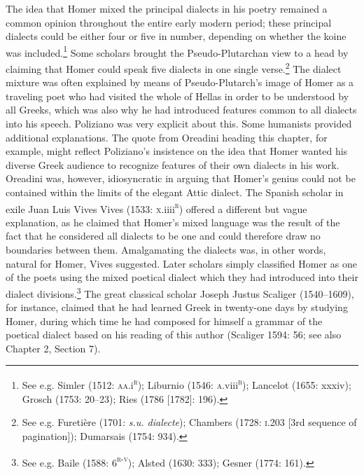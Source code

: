 \begin{styleStandard}
The idea that Homer mixed the principal dialects in his poetry remained a common opinion throughout the entire early modern period; these principal dialects could be either four or five in number, depending on whether the koine was included.\footnote{ See e.g. Simler (1512: \textsc{aa.}i\textsc{\textsuperscript{r}}); Liburnio (1546: \textsc{a}.viii\textsc{\textsuperscript{r}}); Lancelot (1655: xxxiv); Grosch (1753: 20–23); Ries (1786 [1782]: 196).} Some scholars brought the Pseudo-Plutarchan view to a head by claiming that Homer could speak five dialects in one single verse.\footnote{ See e.g. Furetière (1701: \textit{s.u. dialecte}); Chambers (1728: \textsc{i.}203 [3rd sequence of pagination]); Dumarsais (1754: 934).} The dialect mixture was often explained by means of Pseudo-Plutarch’s image of Homer as a traveling poet who had visited the whole of Hellas in order to be understood by all Greeks, which was also why he had introduced features common to all dialects into his speech. Poliziano was very explicit about this. Some humanists provided additional explanations. The quote from Oreadini heading this chapter, for example, might reflect Poliziano’s insistence on the idea that Homer wanted his diverse Greek audience to recognize features of their own dialects in his work. Oreadini was, however, idiosyncratic in arguing that Homer’s genius could not be contained within the limits of the elegant Attic dialect. The Spanish scholar in exile Juan Luis Vives Vives (1533: \textsc{x}.iiii\textsc{\textsuperscript{r}}) offered a different but vague explanation, as he claimed that Homer’s mixed language was the result of the fact that he considered all dialects to be one and could therefore draw no boundaries between them. Amalgamating the dialects was, in other words, natural for Homer, Vives suggested. Later scholars simply classified Homer as one of the poets using the mixed poetical dialect which they had introduced into their dialect divisions.\footnote{ See e.g. Baile (1588: 6\textsc{\textsuperscript{r-v}}); Alsted (1630: 333); Gesner (1774: 161).} The great classical scholar Joseph Justus Scaliger (1540–1609), for instance, claimed that he had learned Greek in twenty-one days by studying Homer, during which time he had composed for himself a grammar of the poetical dialect based on his reading of this author (Scaliger 1594: 56; see also Chapter 2, Section 7).
\end{styleStandard}

